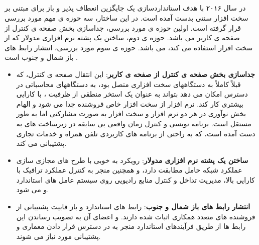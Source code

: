 \subsection{}
در سال ۲۰۱۶ با هدف استانداردسازی یک جایگزین انعطاف پذیر و باز برای 
مبتنی بر سخت افزار سنتی بدست آمده است.
 در این ساختار، سه حوزه ی مهم مورد بررسی قرار گرفته است.
اولین حوزه ی مورد بررسی، جداسازی بخش
صفحه ی کنترل
  از 
 صفحه ی کاربر
می باشد. حوزه ی دوم،
ساختن یک پشته نرم افزاری  مدولار که از سخت افزار  استفاده می کند، می باشد.
حوزه ی سوم مورد بررسی، انتشار رابط های باز شمال و جنوب است
\cite{xran}.
\begin{itemize}
\item \textbf{ جداسازی بخش صفحه ی کنترل از 
صفحه ی کاربر}:
این انتقال صفحه ی کنترل، که قبلاً کاملاً به دستگاههای سخت افزاری  متصل بود، به دستگاههای محاسباتی در دسترس امکان می دهد  بتواند به عنوان یک استخر منطقی از ظرفیت ، با کارایی بیشتری کار کند.
نرم افزار  از سخت افزار خاص فروشنده جدا می شود و الهام بخش نوآوری در هر دو نرم افزار و سخت افزار به صورت مشارکتی اما به طور مستقل است.
برنامه نویسی و کنترل زمان واقعی بی سابقه در زیرساخت های  به دست آمده است، که به راحتی از برنامه های کاربردی تلفن همراه و خدمات تجاری پشتیبانی می کند.
\item \textbf{ساختن یک پشته نرم افزاری  مدولار}:
رویکرد  به خوبی با طرح های مجازی سازی عملکرد شبکه حامل  مطابقت دارد، و همچنین منجر به کنترل عملکرد ترافیک با کارایی بالا، مدیریت تداخل و کنترل منابع رادیویی روی سیستم عامل های استاندارد  و می شود.
\item \textbf{انتشار رابط های باز شمال و جنوب}: 
رابط های استاندارد و باز قابیت پشتیبانی از فروشنده های متعدد همکاری اثبات شده دارند. 
و اعضای آن به تصویب رساندن این رابط ها از طریق فرآیندهای استاندارد منجر به در دسترس قرار دادن معماری  و پشتیبانی مورد نیاز می شوند.
\cite{xran1}
\end{itemize}
